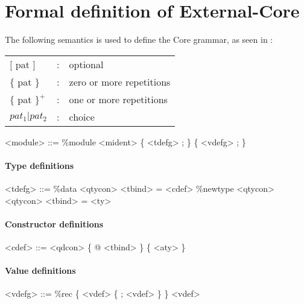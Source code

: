 
\section{Formal definition of External-Core}
\label{coregrammar}


The following semantics is used to define the Core grammar, 
as seen in \cite{tolmach2010ghc}:

\begin{scriptsize}

\begin{longtable}{ l c l }

$[$ pat $]$		& :	& optional			\\
$\{$ pat $\}$		& :	& zero or more repetitions	\\
$\{$ pat $\}^{+}$	& :	& one or more repetitions	\\
$pat_{1}|pat_{2}$	& :	& choice			\\

\end{longtable}




\begin{grammar}
<module> ::= \%module <mident> \{ <tdefg> ; \} \{ <vdefg> ; \}
\end{grammar}

\paragraph{Type definitions}

\begin{grammar}
<tdefg> ::= \%data <qtycon> <tbind> = <cdef>
       \alt \%newtype <qtycon> <qtycon> <tbind> = <ty>
\end{grammar}

\paragraph{Constructor definitions}

\begin{grammar}
<cdef> ::= <qdcon> \{ @ <tbind> \} \{ <aty> \}
\end{grammar}

\paragraph{Value definitions}

\begin{grammar}
<vdefg> ::= \%rec \{ <vdef> \{ ; <vdef> \} \}
       \alt <vdef>
\end{grammar}


\end{scriptsize}
